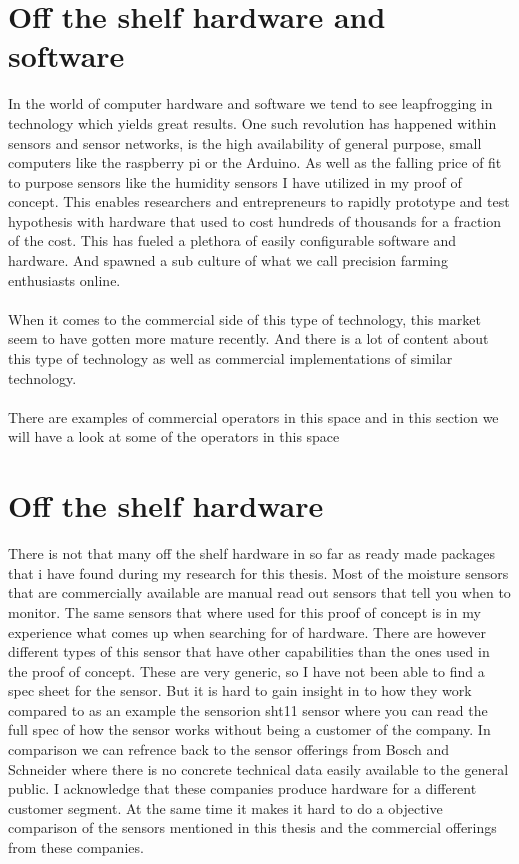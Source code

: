 \documentclass[]{uiophd}
\begin{document}
\section{Off the shelf hardware and software}
In the world of computer hardware and software we tend to see leapfrogging in technology which yields great results. One such revolution has happened within sensors and sensor networks, is the high availability of general purpose, small computers like the raspberry pi or the Arduino. As well as the falling price of fit to purpose sensors like the humidity sensors I have utilized in my proof of concept. This enables researchers and entrepreneurs to rapidly prototype and test hypothesis with hardware that used to cost hundreds of thousands for a fraction of the cost. This has fueled a plethora of easily configurable software and hardware. And spawned a sub culture of what we call precision farming enthusiasts online. 
\\\\
When it comes to the commercial side of this type of technology, this market seem to have gotten more mature recently. And there is a lot of content about this type of technology as well as commercial implementations of similar technology.
\\\\
There are examples of commercial operators in this space and in this section we will have a look at some of the operators in this space


\section{Off the shelf hardware}
There is not that many off the shelf hardware in so far as ready made packages that i have found during my research for this thesis. Most of the moisture sensors that are commercially available are manual read out sensors that tell you when to monitor. The same sensors that where used for this proof of concept is in my experience what comes up when searching for  of hardware. There are however different types of this sensor that have other capabilities than the ones used in the proof of concept. These are very generic, so I have not been able to find a spec sheet for the sensor. But it is hard to gain insight in to how they work compared to as an example the sensorion sht11 sensor\parencite{sensorion} where you can read the full spec of how the sensor works without being a customer of the company. In comparison we can refrence back to the sensor offerings from Bosch and Schneider where there is no concrete technical data easily available to the general public. I acknowledge that these companies produce hardware for a different customer segment. At the same time it makes it hard to do a objective comparison of the sensors mentioned in this thesis and the commercial offerings from these companies.
\end{document}
